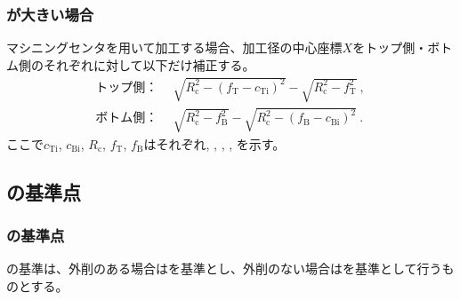 \subsubsection{\EndFaceInCChamferLength が大きい場合}
マシニングセンタを用いて加工する場合、加工径の中心座標$X$をトップ側・ボトム側のそれぞれに対して以下だけ補正する。
\begin{align*}
  \text{トップ側：}&~~
  \sqrt{R_\mathrm c^2-\left(f_\mathrm T-c_\mathrm{Ti}\right)^2}-\sqrt{R_\mathrm c^2-f_\mathrm T^2}\ ,\\
  \text{ボトム側：}&~~
  \sqrt{R_\mathrm c^2-f_\mathrm B^2}-\sqrt{R_\mathrm c^2-\left(f_\mathrm B-c_\mathrm{Bi}\right)^2}\ .
\end{align*}
ここで$c_\mathrm{Ti}$, $c_\mathrm{Bi}$, $R_\mathrm c$, $f_\mathrm T$, $f_\mathrm B$はそれぞれ\TopEndFaceInCChamferLength, \BottomEndFaceInCChamferLength, \CenterCurvatureRadius, \TopAlocationLength, \BottomAlocationLength を示す。



\clearpage


\subsection{\EndFaceRChamferMilling の基準点}

\subsubsection{\EndFaceOutRChamferMilling の基準点}
\EndFaceOutRChamferMilling の基準は、外削のある場合は\OutcutCenter を基準とし、外削のない場合は\EndFaceIDCenter を基準として行うものとする。

